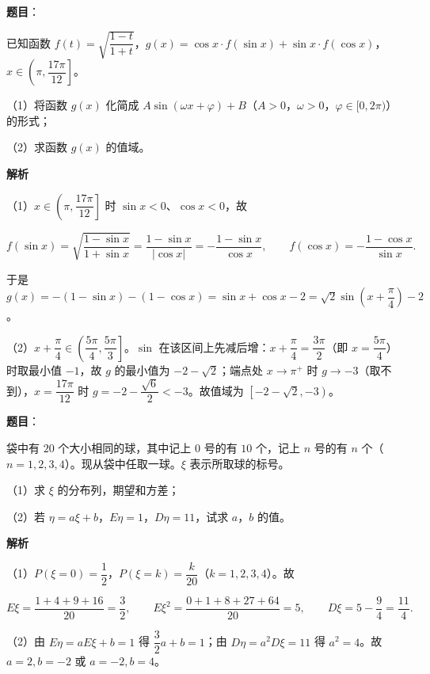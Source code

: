 \begin{answer}

\textbf{题目}：

已知函数 $f(t)=\sqrt{\dfrac{1-t}{1+t}}$，$g(x)=\cos x\cdot f(\sin x)+\sin x\cdot f(\cos x)$，$x\in\left(\pi,\dfrac{17\pi}{12}\right]$。

（1）将函数 $g(x)$ 化简成 $A\sin(\omega x+\varphi)+B$（$A>0$，$\omega>0$，$\varphi\in[0,2\pi)$）的形式；

（2）求函数 $g(x)$ 的值域。

\textbf{解析}

（1）$x\in\left(\pi,\dfrac{17\pi}{12}\right]$ 时 $\sin x<0$、$\cos x<0$，故

\nopagebreak[4]
\[f(\sin x)=\sqrt{\frac{1-\sin x}{1+\sin x}}=\frac{1-\sin x}{|\cos x|}=-\frac{1-\sin x}{\cos x},\qquad f(\cos x)=-\frac{1-\cos x}{\sin x}.\]

于是 $g(x)=-(1-\sin x)-(1-\cos x)=\sin x+\cos x-2=\sqrt2\sin\left(x+\dfrac\pi4\right)-2$。

（2）$x+\dfrac\pi4\in\left(\dfrac{5\pi}4,\dfrac{5\pi}3\right]$。$\sin$ 在该区间上先减后增：$x+\dfrac\pi4=\dfrac{3\pi}2$（即 $x=\dfrac{5\pi}4$）时取最小值 $-1$，故 $g$ 的最小值为 $-2-\sqrt2$；端点处 $x\to\pi^+$ 时 $g\to-3$（取不到），$x=\dfrac{17\pi}{12}$ 时 $g=-2-\dfrac{\sqrt6}2<-3$。故值域为 $\left[-2-\sqrt2,-3\right)$。

\gkanswer{答案：（1）$g(x)=\sqrt2\sin\left(x+\dfrac\pi4\right)-2$；（2）值域 $\left[-2-\sqrt2,-3\right)$。}

\end{answer}
\begin{answer}

\textbf{题目}：

袋中有 $20$ 个大小相同的球，其中记上 $0$ 号的有 $10$ 个，记上 $n$ 号的有 $n$ 个（$n=1,2,3,4$）。现从袋中任取一球。$\xi$ 表示所取球的标号。

（1）求 $\xi$ 的分布列，期望和方差；

（2）若 $\eta=a\xi+b$，$E\eta=1$，$D\eta=11$，试求 $a$，$b$ 的值。

\textbf{解析}

（1）$P(\xi=0)=\dfrac12$，$P(\xi=k)=\dfrac k{20}$（$k=1,2,3,4$）。故

\nopagebreak[4]
\[E\xi=\frac{1+4+9+16}{20}=\frac32,\qquad E\xi^2=\frac{0+1+8+27+64}{20}=5,\qquad D\xi=5-\frac94=\frac{11}4.\]

（2）由 $E\eta=aE\xi+b=1$ 得 $\dfrac32a+b=1$；由 $D\eta=a^2D\xi=11$ 得 $a^2=4$。故 $a=2,b=-2$ 或 $a=-2,b=4$。


\end{answer}

